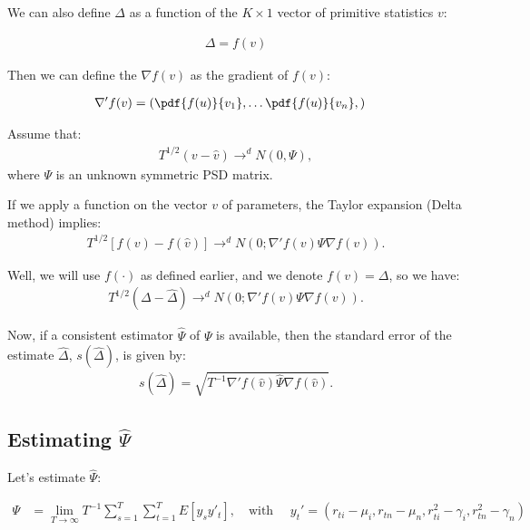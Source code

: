 \documentclass[12pt,oneside,a4paper]{article}
\begin{document}
We can also define $\Delta$ as a function of the $K \times 1$ vector of primitive statistics $v$:

\begin{align*}
	\Delta = f(v)
\end{align*}

Then we can define the $\nabla f(v)$ as the gradient of $f(v)$:

\begin{align*}
\nabla' f(v) &=
\left( 
\pdf{f(u)}{v_{1}},
\dots
\pdf{f(u)}{v_{n}},
\right)
\end{align*}

% 
Assume that:
\begin{align*}
	T^{1/2}(v - \hat{v}) \to^d N(0, \Psi),
\end{align*}
where $\Psi$ is an unknown symmetric PSD matrix.

If we apply a function on the vector $v$ of parameters, the Taylor expansion (Delta method) implies:
\begin{align*}
T^{1/2}[f(v) - f(\hat{v})] \to^d N \left( 0; \nabla'f(v) \Psi \nabla f(v)  \right).
\end{align*}

Well, we will use $f(\cdot)$ as defined earlier, and we denote $f(v) = \Delta$, so we have:
\begin{align*}
T^{1/2}(\Delta - \hat{\Delta}) 	\to^d N \left( 0; \nabla'f(v) \Psi \nabla f(v)  \right).
\end{align*}

Now, if a consistent estimator $\hat{\Psi}$ of $\Psi$ is available, then the standard error of the estimate $\hat{\Delta}$, $s(\hat{\Delta})$, is given by:
\begin{align}
s(\hat{\Delta}) = \sqrt{T^{-1} \nabla'f(\hat{v}) \hat{\Psi} \nabla f(\hat{v})}.
\end{align}

\subsection{Estimating $\hat{\Psi}$}

Let's estimate $\hat{\Psi}$:

\begin{align*}
\Psi &= \lim_{T \to \infty} T^{-1} \sum_{s=1}^{T}\sum_{t=1}^{T} E[y_{s}y'_{t}],
\quad \text{with } \quad
y_{t}' = \left(  r_{ti} - \mu_{i}, r_{tn} - \mu_{n}, r^2_{ti} - \gamma_{i}, r^2_{tn} - \gamma_{n} \right)
\end{align*}
\end{document}

